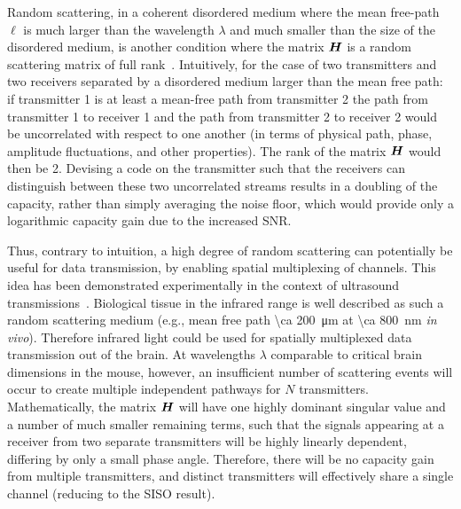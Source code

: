Random scattering, in a coherent disordered medium where the mean free-path $\ell$ is much larger than the wavelength $\lambda$ and much smaller than the size of the disordered medium, is another condition where the matrix $\mat{H}$ is a random scattering matrix of full rank~\cite{moustakas00,popoff10}.
Intuitively, for the case of two transmitters and two receivers separated by a disordered medium larger than the mean free path:
if transmitter 1 is at least a mean-free path from transmitter 2 the path from transmitter 1 to receiver 1 and the path from transmitter 2 to receiver 2 would be uncorrelated with respect to one another (in terms of physical path, phase, amplitude fluctuations, and other properties).
The rank of the matrix $\mat{H}$ would then be 2.
Devising a code on the transmitter such that the receivers can distinguish between these two uncorrelated streams results in a doubling of the capacity, rather than simply averaging the noise floor, which would provide only a logarithmic capacity gain due to the increased SNR.

Thus, contrary to intuition, a high degree of random scattering can potentially be useful for data transmission, by enabling spatial multiplexing of channels.
This idea has been demonstrated experimentally in the context of ultrasound transmissions~\cite{derode03}.
Biological tissue in the infrared range is well described as such a random scattering medium (e.g., mean free path \SI{\ca 200}{\micro\meter} at \SI{\ca 800}{\nano\meter} \emph{in vivo}).
Therefore infrared light could be used for spatially multiplexed data transmission out of the brain.
At wavelengths $\lambda$ comparable to critical brain dimensions in the mouse, however, an insufficient number of scattering events will occur to create multiple independent pathways for $N$ transmitters.
Mathematically, the matrix $\mat{H}$ will have one highly dominant singular value and a number of much smaller remaining terms, such that the signals appearing at a receiver from two separate transmitters will be highly linearly dependent, differing by only a small phase angle.
Therefore, there will be no capacity gain from multiple transmitters, and distinct transmitters will effectively share a single channel (reducing to the SISO result).

